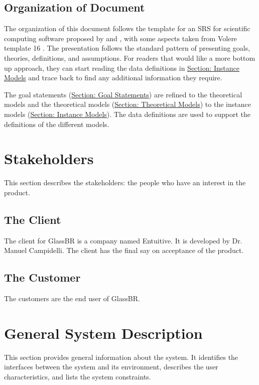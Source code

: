 \documentclass[12pt]{article}
\begin{document}
\subsection{Organization of Document}
\label{Sec:DocOrg}
The organization of this document follows the template for an SRS for scientific computing software proposed by \cite{koothoor2013} and \cite{smithLai2005}, with some aspects taken from Volere template 16 \cite{rbrtsn2012}. The presentation follows the standard pattern of presenting goals, theories, definitions, and assumptions. For readers that would like a more bottom up approach, they can start reading the data definitions in \hyperref[Sec:IMs]{Section: Instance Models} and trace back to find any additional information they require.

The goal statements (\hyperref[Sec:GoalStmt]{Section: Goal Statements}) are refined to the theoretical models and the theoretical models (\hyperref[Sec:TMs]{Section: Theoretical Models}) to the instance models (\hyperref[Sec:IMs]{Section: Instance Models}). The data definitions are used to support the definitions of the different models.

\section{Stakeholders}
\label{Sec:Stakeholder}
This section describes the stakeholders: the people who have an interest in the product.

\subsection{The Client}
\label{Sec:Client}
The client for GlassBR is a company named Entuitive. It is developed by Dr. Manuel Campidelli. The client has the final say on acceptance of the product.

\subsection{The Customer}
\label{Sec:Customer}
The customers are the end user of GlassBR.

\section{General System Description}
\label{Sec:GenSysDesc}
This section provides general information about the system. It identifies the interfaces between the system and its environment, describes the user characteristics, and lists the system constraints.
\end{document}
